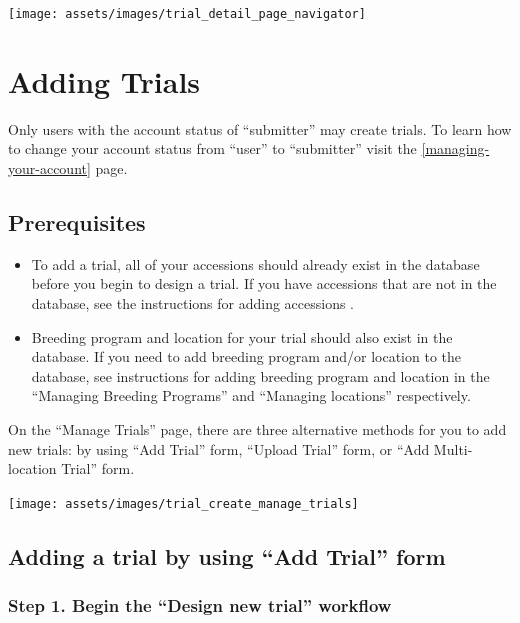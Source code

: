 \documentclass[
  12pt,
]{book}
\begin{document}
\begin{center}\texttt{[image: assets/images/trial\_detail\_page\_navigator]} \end{center}

\hypertarget{adding-trials}{%
\section{Adding Trials}\label{adding-trials}}

Only users with the account status of ``submitter'' may create trials. To learn how to change your account status from ``user'' to ``submitter'' visit the \ref{managing-your-account} page.

\hypertarget{prerequisites}{%
\subsection{Prerequisites}\label{prerequisites}}

\begin{itemize}
\item
  To add a trial, all of your accessions should already exist in the database before you begin to design a trial. If you have accessions that are not in the database, see the instructions for adding accessions .
\item
  Breeding program and location for your trial should also exist in the database. If you need to add breeding program and/or location to the database, see instructions for adding breeding program and location in the ``Managing Breeding Programs'' and ``Managing locations'' respectively.
\end{itemize}

On the ``Manage Trials'' page, there are three alternative methods for you to add new trials: by using ``Add Trial'' form, ``Upload Trial'' form, or ``Add Multi-location Trial'' form.

\begin{center}\texttt{[image: assets/images/trial\_create\_manage\_trials]} \end{center}

\hypertarget{adding-a-trial-by-using-add-trial-form}{%
\subsection{Adding a trial by using ``Add Trial'' form}\label{adding-a-trial-by-using-add-trial-form}}

\hypertarget{step-1.-begin-the-design-new-trial-workflow}{%
\subsubsection*{Step 1. Begin the ``Design new trial'' workflow}\label{step-1.-begin-the-design-new-trial-workflow}}
\end{document}

